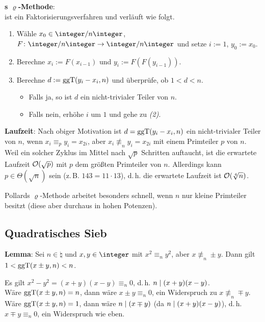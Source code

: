 \linie

\textbf{s $\varrho$-Methode}:\\
 ist ein Faktorisierungsverfahren und verläuft wie
folgt.
\begin{enumerate}
    \item
    Wähle $x_0 \in \ZnZ$, $F\colon \ZnZ \rightarrow \ZnZ$
    und setze $i := 1$, $y_0 := x_0$.

    \item
    Berechne $x_i := F(x_{i-1})$ und $y_i := F(F(y_{i-1}))$.

    \item
    Berechne $d := \operatorname{ggT}(y_i - x_i, n)$ und überprüfe, ob $1 < d < n$.
    \begin{itemize}
        \item
        Falls ja, so ist $d$ ein nicht-trivialer Teiler von $n$.

        \item
        Falls nein, erhöhe $i$ um $1$ und gehe zu \emph{(2)}.
    \end{itemize}
\end{enumerate}

\linie

\textbf{Laufzeit}:
Nach obiger Motivation ist $d = \operatorname{ggT}(y_i - x_i, n)$ ein nicht-trivialer Teiler von $n$, wenn
$x_i \equiv_p y_i = x_{2i}$, aber $x_i \not\equiv_n y_i = x_{2i}$ mit einem Primteiler $p$ von $n$.
Weil ein solcher Zyklus im Mittel nach $\sqrt{p}$ Schritten auftaucht,
ist die erwartete Laufzeit $\mathcal{O}(\sqrt{p})$ mit $p$ dem größten Primteiler von $n$.
Allerdings kann $p \in \Theta(\sqrt{n})$ sein (z.\,B. $143 = 11 \cdot 13$), d.\,h.
die erwartete Laufzeit ist $\mathcal{O}(\sqrt[4]{n})$.

Pollards $\varrho$-Methode arbeitet besonders schnell, wenn $n$ nur kleine Primteiler besitzt
(diese aber durchaus in hohen Potenzen).

\pagebreak

\subsection{%
    Quadratisches Sieb%
}

\textbf{Lemma}:
Sei $n \in \natural$ und $x, y \in \integer$ mit $x^2 \equiv_n y^2$, aber $x \not\equiv_n \pm y$.
Dann gilt $1 < \operatorname{ggT}(x \pm y, n) < n$.

\begin{Beweis}
    Es gilt $x^2 - y^2 = (x + y)(x - y) \equiv_n 0$, d.\,h. $n \mid (x + y)(x - y)$.\\
    Wäre $\operatorname{ggT}(x \pm y, n) = n$, dann wäre $x \pm y \equiv_n 0$,
    ein Widerspruch zu $x \not\equiv_n \mp y$.\\
    Wäre $\operatorname{ggT}(x \pm y, n) = 1$, dann wäre $n \mid (x \mp y)$
    (da $n \mid (x + y)(x - y)$), d.\,h. $x \mp y \equiv_n 0$,
    ein Widerspruch wie eben.
\end{Beweis}

